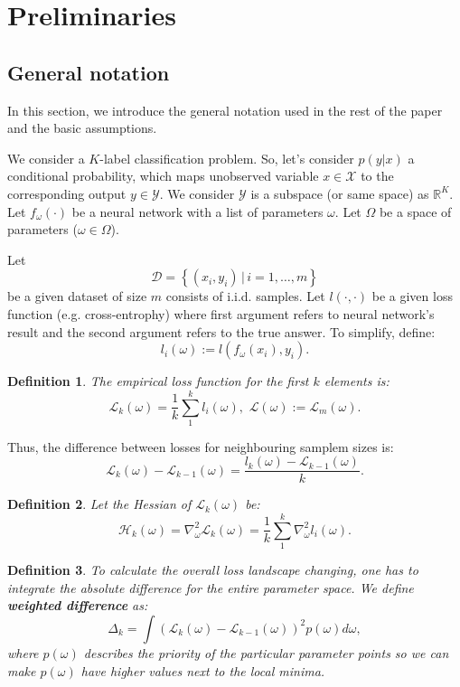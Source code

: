 \documentclass{article}
\newtheorem{definition}{Definition}
\begin{document}
\section{Preliminaries}\label{sec:prelim}

\subsection{General notation}

In this section, we introduce the general notation used in the rest of the paper and the basic assumptions.

We consider a $K$-label classification problem.
So, let's consider $p(y|x)$ a conditional probability, which maps unobserved variable $x \in \mathcal{X}$ to the corresponding
output $y \in \mathcal{Y}$. We consider $\mathcal{Y}$ is a subspace (or same space) as $\mathbb{R}^K$. Let $f_{\omega}(\cdot)$
be a neural network with a list of parameters $\omega$. Let $\Omega$ be a space of parameters ($\omega \in \Omega$).

Let
$$\mathcal{D} = \left\{ (x_i, y_i) \, | \, i = 1, \dots, m \right\}$$
be a given dataset of size $m$ consists of i.i.d.
samples. Let $l(\cdot, \cdot)$ be a given loss function (e.g. cross-entrophy) where first argument refers to neural network's
result and the second argument refers to the true answer. To simplify, define: $$l_i(\omega) := l(f_{\omega}(x_i), y_i).$$

\begin{definition}
  The empirical loss function for the first $k$ elements is:
  $$\mathcal{L}_k(\omega) = \frac1k \sum\limits_1^k l_i(\omega), \,\, \mathcal{L}(\omega) := \mathcal{L}_m(\omega).$$
\end{definition}

Thus, the difference between losses for neighbouring samplem sizes is:
$$\mathcal{L}_{k}(\omega) - \mathcal{L}_{k-1}(\omega) = \frac{l_{k}(\omega) - \mathcal{L}_{k-1}(\omega)}{k}.$$

\begin{definition}
  Let the Hessian of $\mathcal{L}_k(\omega)$ be:
  $$\mathcal{H}_k(\omega) = \nabla^2_{\omega}\mathcal{L}_k(\omega) = \frac1k \sum\limits_1^k \nabla^2_{\omega} l_i(\omega).$$
\end{definition}

\begin{definition}
  To calculate the overall loss landscape changing, one has to integrate the absolute difference for the entire parameter space.
  We define \textbf{weighted difference} as:
  $$\Delta_{k} = \int \left( \mathcal{L}_{k}(\omega) - \mathcal{L}_{k-1}(\omega) \right)^2 p(\omega) d\omega,$$
  where $p(\omega)$ describes the priority of the particular parameter points so we can make $p(\omega)$ have higher values
  next to the local minima.
\end{definition}
\end{document}
